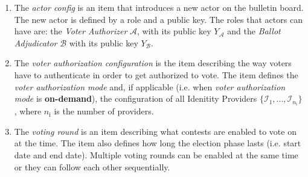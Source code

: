 \begin{enumerate}
    \item The \textit{actor config} is an item that introduces a new actor on the bulletin board. The new actor is defined by a role and a public key. The roles that actors can have are: the \textit{Voter Authorizer} $\mathcal{A}$, with its public key $Y_\mathcal{A}$ and the \textit{Ballot Adjudicator} $\mathcal{B}$ with its public key $Y_\mathcal{B}$.

    \item The \textit{voter authorization configuration} is the item describing the way voters have to authenticate in order to get authorized to vote. The item defines the \textit{voter authorization mode} and, if applicable (i.e. when \textit{voter authorization mode} is \textbf{on-demand}), the configuration of all Idenitity Providers $\{\mathcal{I}_1, ..., \mathcal{I}_{n_\mathrm{i}}\}$, where $n_\mathrm{i}$ is the number of providers.
    
    \item The \textit{voting round} is an item describing what contests are enabled to vote on at the time. The item also defines how long the election phase lasts (i.e. start date and end date). Multiple voting rounds can be enabled at the same time or they can follow each other sequentially.
\end{enumerate}

